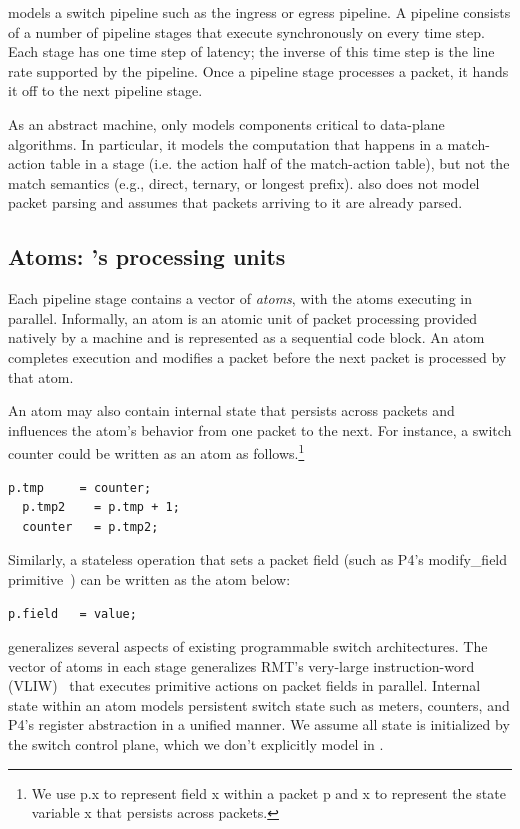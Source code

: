 \absmachine models a switch pipeline such as the ingress or egress pipeline. A
pipeline consists of a number of pipeline stages that execute synchronously on
every time step. Each stage has one time step of latency; the inverse of this
time step is the line rate supported by the pipeline. Once a pipeline stage
processes a packet, it hands it off to the next pipeline stage.

As an abstract machine, \absmachine only models components critical to
data-plane algorithms. In particular, it models the computation that happens in
a match-action table in a stage (i.e. the action half of the match-action
table), but not the match semantics (e.g., direct, ternary, or longest prefix).
\absmachine also does not model packet parsing and assumes that packets
arriving to it are already parsed.

\subsection{Atoms: \absmachine's processing units}

Each pipeline stage contains a vector of \textit{atoms}, with the atoms
executing in parallel. Informally, an atom is an atomic unit of packet
processing provided natively by a \absmachine machine and is represented as a
sequential code block. An atom completes execution and modifies a packet before
the next packet is processed by that atom.

An atom may also contain internal state that persists across packets and
influences the atom's behavior from one packet to the next. For instance, a
switch counter could be written as an atom as follows.\footnote{We use
  p.x to represent field x within a packet p and x to represent
  the state variable x that persists across packets.}
  \begin{lstlisting}[style=customc]
  p.tmp     = counter;
  p.tmp2    = p.tmp + 1;
  counter   = p.tmp2;
  \end{lstlisting}
Similarly, a stateless operation that sets a packet field (such as P4's
modify\_field primitive~\cite{p4spec}) can be written as the atom
below:
\begin{lstlisting}[style=customc]
p.field   = value;
\end{lstlisting}

\absmachine generalizes several aspects of existing programmable switch
architectures. The vector of atoms in each stage generalizes RMT's very-large
instruction-word (VLIW)~\cite{rmt} that executes primitive actions on packet
fields in parallel. Internal state within an atom models persistent switch
state such as meters, counters, and P4's register abstraction in a unified
manner. We assume all state is initialized by the switch control plane, which
we don't explicitly model in \absmachine.


